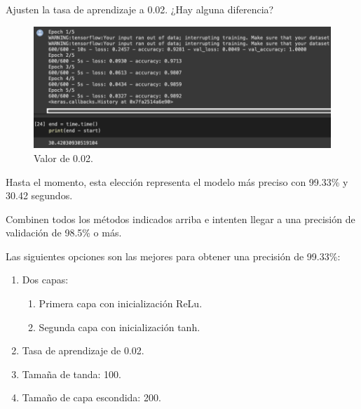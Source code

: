 \begin{problema}
	Ajusten la tasa de aprendizaje a 0.02.  ¿Hay alguna diferencia?
		\begin{figure}[H]
		\centering
		\includegraphics[scale=0.5]{Images/9.png}
		\caption{Valor de 0.02.}
	\end{figure}
	\begin{sol}
		Hasta el momento, esta elección representa el modelo más preciso con 99.33\% y 30.42 segundos. 
	\end{sol}
\end{problema}
\begin{problema}
	Combinen todos los métodos indicados arriba e intenten llegar a una precisión de validación de 98.5\% o más.
	\begin{sol}
		Las siguientes opciones son las mejores para obtener una precisión de 99.33\%:
	\begin{enumerate}
		\item Dos capas: 
		\begin{enumerate}
			\item Primera capa con inicialización ReLu. 
			\item Segunda capa con inicialización tanh. 
		\end{enumerate}
	\item Tasa de aprendizaje de 0.02. 
	\item Tamaña de tanda: 100. 
	\item Tamaño de capa escondida: 200. 
\end{enumerate}	\end{sol}
\end{problema}








